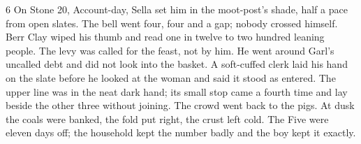 \begin{CRchronicle}{6}
On Stone 20, Account-day, Sella set him in the moot-post’s shade, half a pace from open slates. The bell went four, four and a gap; nobody crossed himself. Berr Clay wiped his thumb and read one in twelve to two hundred leaning people. The levy was called for the feast, not by him. He went around Garl’s uncalled debt and did not look into the basket. A soft-cuffed clerk laid his hand on the slate before he looked at the woman and said it stood as entered. The upper line was in the neat dark hand; its small stop came a fourth time and lay beside the other three without joining. The crowd went back to the pigs. At dusk the coals were banked, the fold put right, the crust left cold. The Five were eleven days off; the household kept the number badly and the boy kept it exactly.
\end{CRchronicle}
